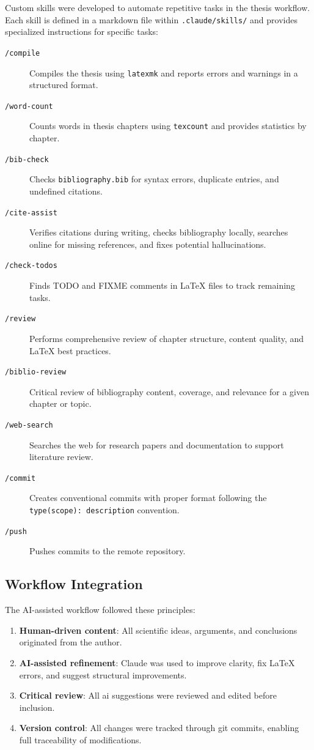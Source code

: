 Custom skills were developed to automate repetitive tasks in the thesis workflow.
Each skill is defined in a markdown file within \texttt{.claude/skills/} and provides specialized instructions for specific tasks:

\begin{description}
    \item[\texttt{/compile}] Compiles the thesis using \texttt{latexmk} and reports errors and warnings in a structured format.
    \item[\texttt{/word-count}] Counts words in thesis chapters using \texttt{texcount} and provides statistics by chapter.
    \item[\texttt{/bib-check}] Checks \texttt{bibliography.bib} for syntax errors, duplicate entries, and undefined citations.
    \item[\texttt{/cite-assist}] Verifies citations during writing, checks bibliography locally, searches online for missing references, and fixes potential hallucinations.
    \item[\texttt{/check-todos}] Finds TODO and FIXME comments in LaTeX files to track remaining tasks.
    \item[\texttt{/review}] Performs comprehensive review of chapter structure, content quality, and LaTeX best practices.
    \item[\texttt{/biblio-review}] Critical review of bibliography content, coverage, and relevance for a given chapter or topic.
    \item[\texttt{/web-search}] Searches the web for research papers and documentation to support literature review.
    \item[\texttt{/commit}] Creates conventional commits with proper format following the \texttt{type(scope): description} convention.
    \item[\texttt{/push}] Pushes commits to the remote repository.
\end{description}

\subsection{Workflow Integration}

The AI-assisted workflow followed these principles:
\begin{enumerate}
    \item \textbf{Human-driven content}: All scientific ideas, arguments, and conclusions originated from the author.
    \item \textbf{AI-assisted refinement}: Claude was used to improve clarity, fix LaTeX errors, and suggest structural improvements.
    \item \textbf{Critical review}: All \gls{ai} suggestions were reviewed and edited before inclusion.
    \item \textbf{Version control}: All changes were tracked through git commits, enabling full traceability of modifications.
\end{enumerate}


